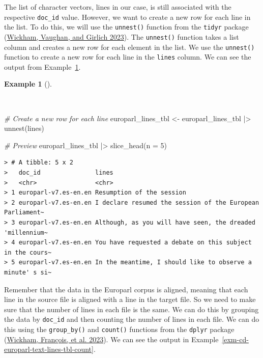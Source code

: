 \documentclass[
  letterpaper,
  DIV=11,
  numbers=noendperiod]{scrreport}
\newenvironment{Shaded}{\begin{snugshade}}{\end{snugshade}}
\newcommand{\AttributeTok}[1]{\textcolor[rgb]{0.00,0.00,0.00}{#1}}
\newcommand{\CommentTok}[1]{\textcolor[rgb]{0.00,0.00,0.00}{\textit{#1}}}
\newcommand{\DecValTok}[1]{\textcolor[rgb]{0.00,0.00,0.00}{#1}}
\newcommand{\FunctionTok}[1]{\textcolor[rgb]{0.00,0.00,0.00}{#1}}
\newcommand{\NormalTok}[1]{\textcolor[rgb]{0.00,0.00,0.00}{#1}}
\newcommand{\OtherTok}[1]{\textcolor[rgb]{0.00,0.00,0.00}{#1}}
\newcommand{\SpecialCharTok}[1]{\textcolor[rgb]{0.00,0.00,0.00}{#1}}
\theoremstyle{definition}
\newtheorem{example}{Example}[chapter]
\theoremstyle{remark}
\begin{document}
The list of character vectors, lines in our case, is still associated
with the respective \texttt{doc\_id} value. However, we want to create a
new row for each line in the list. To do this, we will use the
\texttt{unnest()} function from the \texttt{tidyr} package
(\protect\hyperlink{ref-R-tidyr}{Wickham, Vaughan, and Girlich 2023}).
The \texttt{unnest()} function takes a list column and creates a new row
for each element in the list. We use the \texttt{unnest()} function to
create a new row for each line in the \texttt{lines} column. We can see
the output from Example~\ref{exm-cd-europarl-text-lines-tbl-unnest}.

\begin{example}[]\protect\hypertarget{exm-cd-europarl-text-lines-tbl-unnest}{}\label{exm-cd-europarl-text-lines-tbl-unnest}

~

\begin{Shaded}
\begin{Highlighting}[]
\CommentTok{\# Create a new row for each line}
\NormalTok{europarl\_lines\_tbl }\OtherTok{\textless{}{-}} 
\NormalTok{  europarl\_lines\_tbl }\SpecialCharTok{|\textgreater{}} 
  \FunctionTok{unnest}\NormalTok{(lines)}

\CommentTok{\# Preview}
\NormalTok{europarl\_lines\_tbl }\SpecialCharTok{|\textgreater{}} 
  \FunctionTok{slice\_head}\NormalTok{(}\AttributeTok{n =} \DecValTok{5}\NormalTok{)}
\end{Highlighting}
\end{Shaded}

\begin{verbatim}
> # A tibble: 5 x 2
>   doc_id               lines                                                    
>   <chr>                <chr>                                                    
> 1 europarl-v7.es-en.en Resumption of the session                                
> 2 europarl-v7.es-en.en I declare resumed the session of the European Parliament~
> 3 europarl-v7.es-en.en Although, as you will have seen, the dreaded 'millennium~
> 4 europarl-v7.es-en.en You have requested a debate on this subject in the cours~
> 5 europarl-v7.es-en.en In the meantime, I should like to observe a minute' s si~
\end{verbatim}

\end{example}

Remember that the data in the Europarl corpus is aligned, meaning that
each line in the source file is aligned with a line in the target file.
So we need to make sure that the number of lines in each file is the
same. We can do this by grouping the data by \texttt{doc\_id} and then
counting the number of lines in each file. We can do this using the
\texttt{group\_by()} and \texttt{count()} functions from the
\texttt{dplyr} package (\protect\hyperlink{ref-R-dplyr}{Wickham,
François, et al. 2023}). We can see the output in
Example~\ref{exm-cd-europarl-text-lines-tbl-count}.
\end{document}
